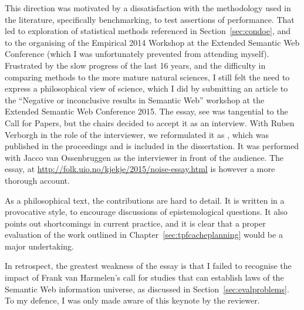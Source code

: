 This direction was motivated by a dissatisfaction with the methodology
used in the literature, specifically benchmarking, to test assertions
of performance. That led to exploration of statistical methods referenced
in Section~\ref{sec:condoe}, and to the organising of the Empirical 2014
Workshop at the Extended Semantic Web Conference (which I was
unfortunately prevented from attending myself). Frustrated by
the slow progress of the last 16 years, and the difficulty in comparing
methods to the more mature natural sciences, I still felt the need to
express a philosophical view of science, which I did by submitting an
article to the ``Negative or inconclusive results in Semantic Web''
workshop at the Extended Semantic Web Conference 2015. The essay, see
\cite{kjernsmo_noise_2015} was tangential to the Call for Papers, but
the chairs decided to accept it as an interview. With Ruben Verborgh
in the role of the interviewer, we reformulated it as
\cite{kjernsmo_noise_2015_interview}, which was published in the
proceedings and is included in the dissertation. It was performed with
Jacco van Ossenbruggen as the interviewer in front of the
audience. The essay, at
\url{http://folk.uio.no/kjekje/2015/noise-essay.html} is however a
more thorough account.

As a philosophical text, the contributions are hard to detail. It is
written in a provocative style, to encourage discussions of
epistemological questions. It also points out shortcomings in current
practice, and it is clear that a proper evaluation of the work
outlined in Chapter~\ref{sec:tpfcacheplanning} would be a major
undertaking. 

In retrospect, the greatest weakness of the essay is that I failed to
recognise the impact of Frank van Harmelen's call for studies that can
establish laws of the Semantic Web information universe, as discussed
in Section~\ref{sec:evalproblems}. To my defence, I was only made
aware of this keynote by the reviewer.
